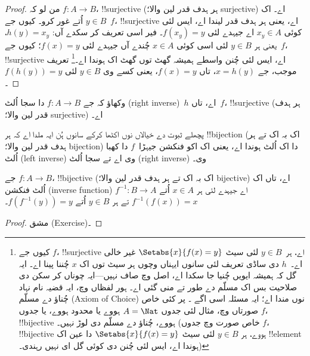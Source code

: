\documentclass[../../../include/open-logic-section]{subfiles}
\begin{document}
\begin{proof}
من لو کہ $f\colon A \to B$، !!{surjective} (ہر ہدف قدر لین والا؛
surjective) اے۔ اک $y \in B$ اُتے غور کرو۔ کیوں جے~$f$،
!!{surjective} اے، یعنی ہر ہدف قدر لیندا اے، ایس لئی کوئی $x_y \in A$
اے جیہدے لئی $f(x_y) = y$۔ فیر اسی تعریف کر سکدے آں:
$h(y) = x_y$، یعنی ہر $y \in B$ لئی اسی کوئی $x \in A$ چُندے آں
جیہدے لئی $f(x) = y$؛ کیوں جے~$f$، !!{surjective} اے، ایس لئی
چُنن واسطے ہمیشہ گھٹ توں گھٹ اک ہوندا اے۔\footnote{کیوں جے $f$،
!!{surjective} اے، ہر~$y \in B$ لئی سیٹ $\Setabs{x}{f(x) = y}$
غیر خالی اے۔~$h$ دی ساڈی تعریف لئی سانوں ایہناں وچوں ہر سیٹ توں
اک $x$ چُننا پینا اے۔ ایہ گل کہ ہمیشہ ایویں چُنیا جا سکدا اے، اصل
وچ صاف نہیں---ایہ چوناں کر سکن دی صلاحیت بس اک مسلّم دے طور تے منی
گئی اے۔ ہور لفظاں وچ، ایہ قضیہ نام نہاد چُناؤ دے مسلّم
(Axiom of Choice) نوں مندا اے؛
ایہ مسئلہ اسی اگے ۔
پر کئی خاص صورتاں وچ، مثال لئی جدوں $A = \Nat$ ہووے یا محدود ہووے،
یا جدوں $f$، !!{bijective} ہووے، چُناؤ دے مسلّم دی لوڑ نہیں۔ (خاص
صورت وچ جدوں $f$، !!{bijective} ہووے، ہر $y \in B$ لئی سیٹ
$\Setabs{x}{f(x) = y}$ دا عین اک !!{element} ہوندا اے، ایس لئی
چُنن دی کوئی گل ای نہیں رہندی۔)}
تعریف موجب، جے $x = h(y)$، تاں $f(x) = y$، یعنی کسے وی
$y \in B$ لئی $f(h(y)) = y$۔
\end{proof}

\begin{prob}
وکھاؤ کہ جے $f\colon A \to B$ دا سجا اُلٹ (right inverse)~$h$
اے، تاں~$f$، !!{surjective} (ہر ہدف قدر لین والا؛ surjective) اے۔
\end{prob}

\begin{explain}
  پچھلے ثبوت دے خیالاں نوں اکٹھا کرکے سانوں ہُن ایہ ملدا اے کہ ہر
  !!{bijection} (اک بہ اک تے ہر ہدف قدر لین والا؛ bijection) دا اک
  اُلٹ ہوندا اے، یعنی اک اکو فنکشن جیہڑا~$f$ دا کھبا اُلٹ
  (left inverse) وی اے تے سجا اُلٹ (right inverse) وی۔
\end{explain}

\begin{prop}
جے $f\colon A \to B$، !!{bijective} (اک بہ اک تے ہر ہدف قدر لین
والا؛ bijective) اے، تاں اک اُلٹ فنکشن (inverse function)
$f^{-1}\colon B \to A$ اے جیہدے لئی ہر $x \in A$ اُتے
$f^{-1}(f(x)) = x$ تے ہر $y \in B$ اُتے $f(f^{-1}(y)) = y$۔
\end{prop}

\begin{proof}
مشق (Exercise)۔
\end{proof}
\end{document}
